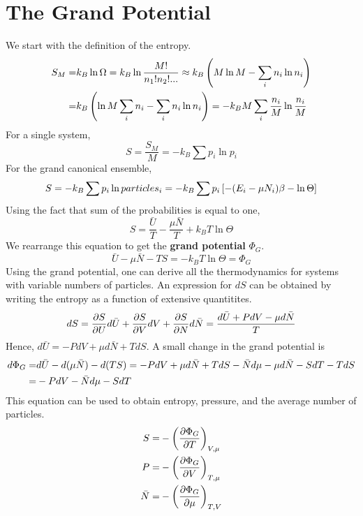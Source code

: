     \section{The Grand Potential}
        We start with the definition of the entropy.
        \begin{align}
            S_M =& k_B\ln\Omega = k_B\ln\frac{M!}{n_1!n_2!...} \approx k_B\left( M\ln M-\sum_in_i\ln n_i \right) \notag\\
                =& k_B\left( \ln M \sum_in_i-\sum_in_i\ln n_i \right)= -k_BM\sum_i\frac{n_i}{M}\ln\frac{n_i}{M}
        \end{align}
        For a single system,
        \begin{equation}
            S = \frac{S_M}{M} = -k_B\sum p_i\ln p_i
        \end{equation}
        For the grand canonical ensemble,
        \begin{equation}
            S = -k_B\sum p_i\ln particles_i = -k_B\sum p_i\left[ -(E_i-\mu N_i)\beta -\ln\Theta \right]
        \end{equation} 
        Using the fact that sum of the probabilities is equal to one,
        \begin{equation}
            S = \frac{\bar{U}}{T} - \frac{\mu \bar{N}}{T}+k_BT\ln\Theta
        \end{equation}
        We rearrange this equation to get the \textbf{grand potential} $\Phi_G$. 
        \begin{equation}
            \bar{U}-\mu\bar{N}-TS = -k_BT\ln\Theta = \Phi_G
        \end{equation}
        Using the grand potential, one can derive all the thermodynamics for systems with variable numbers of particles. An expression for $dS$ can be obtained by writing the entropy as a function of extensive quantitites.
        \begin{equation}
            dS = \frac{\partial S}{\partial U} d\bar{U} + \frac{\partial S}{\partial V}dV + \frac{\partial S}{\partial N}d\bar{N} = \frac{d\bar{U}+PdV-\mu d\bar{N}}{T}
        \end{equation}
        Hence, $d\bar{U} = -PdV +\mu d\bar{N}+TdS$. A small change in the grand potential is
        \begin{align}
            d\Phi_G =& d\bar{U} -d(\mu\bar{N})-d(TS) = -PdV +\mu d\bar{N}+TdS -\bar{N}d\mu-\mu d\bar{N}-SdT-TdS \notag\\
                    =& -PdV-\bar{N}d\mu-SdT
        \end{align}
        This equation can be used to obtain entropy, pressure, and the average number of particles.
        \begin{align}
            S =& -\left( \frac{\partial \Phi_G}{\partial T} \right)_{V,\mu} \\
            P =& -\left( \frac{\partial \Phi_G}{\partial V} \right)_{T,\mu} \\
            \bar{N}=& -\left( \frac{\partial \Phi_G}{\partial \mu} \right)_{T,V}
        \end{align}

